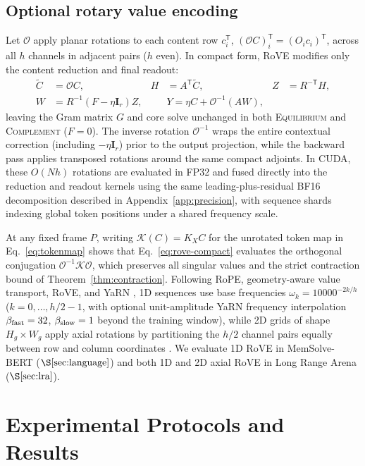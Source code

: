 \documentclass[10pt,twocolumn]{article}
\newcommand{\I}{\mathbf{I}}
\newcommand{\T}{\mathsf{T}}
\begin{document}
\subsection{Optional rotary value encoding}
\label{app:rove}

Let $\mathcal O$ apply planar rotations to each content row $c_i^\T$,
$(\mathcal O C)_i^\T=(O_i c_i)^\T$, across all $h$ channels in adjacent pairs
($h$ even).
In compact form, RoVE modifies only the content reduction and final readout:
\begin{equation}
 \begin{aligned}
 \widetilde C&=\mathcal O C, &H&=A^\T\widetilde C, &Z&=R^{-\T}H,\\
 W&=R^{-1}(F-\eta\I_r)Z, &&Y=\eta C+\mathcal O^{-1}(AW),
 \end{aligned}
 \label{eq:rove-compact}
\end{equation}
leaving the Gram matrix $G$ and core solve unchanged in both
\textsc{Equilibrium} and \textsc{Complement} ($F=0$).
The inverse rotation $\mathcal O^{-1}$ wraps the entire contextual correction
(including $-\eta\I_r$) prior to the output projection, while the backward
pass applies transposed rotations around the same compact adjoints.
In CUDA, these $O(Nh)$ rotations are evaluated in FP32 and fused directly
into the reduction and readout kernels using the same leading-plus-residual
BF16 decomposition described in Appendix~\ref{app:precision}, with sequence
shards indexing global token positions under a shared frequency scale.

At any fixed frame $P$, writing $\mathcal K(C)=K_XC$ for the unrotated token
map in Eq.~\eqref{eq:tokenmap} shows that Eq.~\eqref{eq:rove-compact}
evaluates the orthogonal conjugation $\mathcal O^{-1}\mathcal K\mathcal O$,
which preserves all singular values and the strict contraction bound of
Theorem~\ref{thm:contraction}.
Following RoPE, geometry-aware value transport, RoVE, and YaRN
\cite{su2024roformer,miyato2024gta,garcia2026rove,peng2024yarn}, 1D sequences
use base frequencies $\omega_k=10000^{-2k/h}$ ($k=0,\ldots,h/2-1$, with
optional unit-amplitude YaRN frequency interpolation $\beta_{\rm fast}=32$,
$\beta_{\rm slow}=1$ beyond the training window), while 2D grids of shape
$H_g\times W_g$ apply axial rotations by partitioning the $h/2$ channel pairs
equally between row and column coordinates \cite{heo2024ropevit}.
We evaluate 1D RoVE in MemSolve-BERT ($\S\ref{sec:language}$) and both 1D and
2D axial RoVE in Long Range Arena ($\S\ref{sec:lra}$).

\section{Experimental Protocols and Results}
\label{app:experiments}
\end{document}
